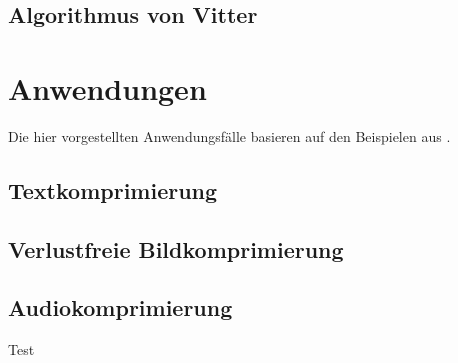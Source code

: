 \documentclass[twoside,11pt,a4paper]{article}
\theoremstyle{break}
\begin{document}

\subsection{Algorithmus von Vitter}

\section{Anwendungen}


Die hier vorgestellten Anwendungsfälle basieren auf den Beispielen aus
\cite{Sayood:2006}.

\subsection{Textkomprimierung}

\subsection{Verlustfreie Bildkomprimierung}

\subsection{Audiokomprimierung}


Test \cite{Salomon:2010}  \cite{Williams:1991}



\end{document}
